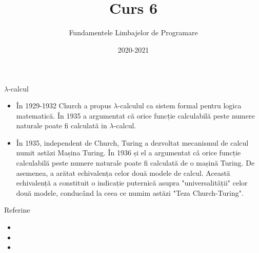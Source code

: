 \documentclass[xcolor=pdftex,romanian,colorlinks]{beamer}
\begin{document}
\title{\\Curs 6}
\author{Fundamentele Limbajelor de Programare} 
\date{2020-2021} 

\frame{\titlepage} 

 


\begin{frame}{$\lambda$-calcul}

\begin{itemize}
\item În 1929-1932 Church a propus 
$\lambda$-calculul ca sistem formal pentru logica matematică.
În 1935 a argumentat că orice funcție calculabilă peste numere naturale poate
fi calculată in $\lambda$-calcul.

\item În 1935, independent de Church, Turing a dezvoltat mecanismul de calcul
numit astăzi Mașina Turing. 
În 1936 și el a argumentat câ orice funcție calculabilă peste numere naturale poate
fi calculată de o mașină Turing.
De asemenea, a arătat echivalența celor două modele de calcul.
Această echivalență a constituit o indicație puternică asupra "universalității" 
celor două modele, conducând la ceea ce numim astăzi "Teza Church-Turing".
\end{itemize}
\end{frame}

\begin{frame}{Referin\ts e}

\begin{itemize}
\item 
\item
\item
\end{itemize}
\end{frame}
\end{document}
